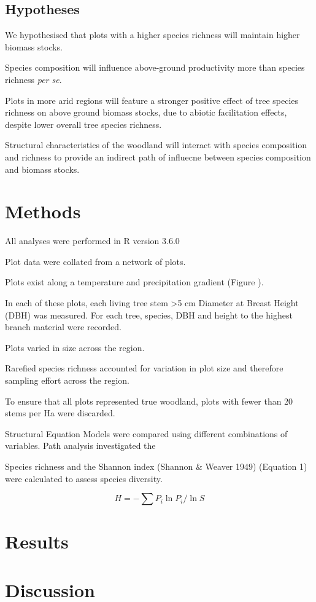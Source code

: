\documentclass[12pt,english,a4paper]{report}
\begin{document}
\subsection{Hypotheses}

We hypothesised that plots with a higher species richness will maintain higher biomass stocks.

Species composition will influence above-ground productivity more than species richness \textit{per se}. 

Plots in more arid regions will feature a stronger positive effect of tree species richness on above ground biomass stocks, due to abiotic facilitation effects, despite lower overall tree species richness.

Structural characteristics of the woodland will interact with species composition and richness to provide an indirect path of influecne between species composition and biomass stocks.


\section{Methods}

All analyses were performed in R version 3.6.0

Plot data were collated from a network of plots.

Plots exist along a temperature and precipitation gradient (Figure ).

In each of these plots, each living tree stem \textgreater{}5 cm Diameter at Breast Height (DBH) was measured. For each tree, species, DBH and height to the highest branch material were recorded. 

Plots varied in size across the region. 

Rarefied species richness accounted for variation in plot size and therefore sampling effort across the region.

To ensure that all plots represented true woodland, plots with fewer than 20 stems per Ha were discarded.

Structural Equation Models were compared using different combinations of variables. Path analysis investigated the 

Species richness and the Shannon index (Shannon \& Weaver 1949) (Equation 1) were calculated to assess species diversity.

\begin{equation}
	H = -\sum{}P_i \ln{P_i} / \ln{S} 
\end{equation}


\section{Results}

\section{Discussion}
\end{document}
